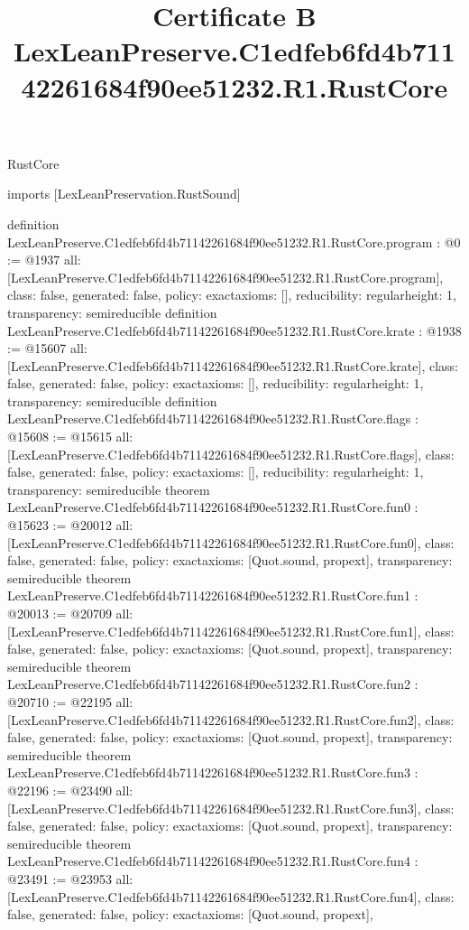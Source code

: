 \begin{lexlean}{RustCore}
\title{Certificate B LexLeanPreserve.C1edfeb6fd4b71142261684f90ee51232.R1.RustCore}
\begin{coremodule}
imports [LexLeanPreservation.RustSound]

definition LexLeanPreserve.C1edfeb6fd4b71142261684f90ee51232.R1.RustCore.program : @0 := @1937 {
  all: [LexLeanPreserve.C1edfeb6fd4b71142261684f90ee51232.R1.RustCore.program],
  class: false,
  generated: false,
  policy: exact{axioms: []},
  reducibility: regular{height: 1},
  transparency: semireducible
}
definition LexLeanPreserve.C1edfeb6fd4b71142261684f90ee51232.R1.RustCore.krate : @1938 := @15607 {
  all: [LexLeanPreserve.C1edfeb6fd4b71142261684f90ee51232.R1.RustCore.krate],
  class: false,
  generated: false,
  policy: exact{axioms: []},
  reducibility: regular{height: 1},
  transparency: semireducible
}
definition LexLeanPreserve.C1edfeb6fd4b71142261684f90ee51232.R1.RustCore.flags : @15608 := @15615 {
  all: [LexLeanPreserve.C1edfeb6fd4b71142261684f90ee51232.R1.RustCore.flags],
  class: false,
  generated: false,
  policy: exact{axioms: []},
  reducibility: regular{height: 1},
  transparency: semireducible
}
theorem LexLeanPreserve.C1edfeb6fd4b71142261684f90ee51232.R1.RustCore.fun0 : @15623 := @20012 {
  all: [LexLeanPreserve.C1edfeb6fd4b71142261684f90ee51232.R1.RustCore.fun0],
  class: false,
  generated: false,
  policy: exact{axioms: [Quot.sound, propext]},
  transparency: semireducible
}
theorem LexLeanPreserve.C1edfeb6fd4b71142261684f90ee51232.R1.RustCore.fun1 : @20013 := @20709 {
  all: [LexLeanPreserve.C1edfeb6fd4b71142261684f90ee51232.R1.RustCore.fun1],
  class: false,
  generated: false,
  policy: exact{axioms: [Quot.sound, propext]},
  transparency: semireducible
}
theorem LexLeanPreserve.C1edfeb6fd4b71142261684f90ee51232.R1.RustCore.fun2 : @20710 := @22195 {
  all: [LexLeanPreserve.C1edfeb6fd4b71142261684f90ee51232.R1.RustCore.fun2],
  class: false,
  generated: false,
  policy: exact{axioms: [Quot.sound, propext]},
  transparency: semireducible
}
theorem LexLeanPreserve.C1edfeb6fd4b71142261684f90ee51232.R1.RustCore.fun3 : @22196 := @23490 {
  all: [LexLeanPreserve.C1edfeb6fd4b71142261684f90ee51232.R1.RustCore.fun3],
  class: false,
  generated: false,
  policy: exact{axioms: [Quot.sound, propext]},
  transparency: semireducible
}
theorem LexLeanPreserve.C1edfeb6fd4b71142261684f90ee51232.R1.RustCore.fun4 : @23491 := @23953 {
  all: [LexLeanPreserve.C1edfeb6fd4b71142261684f90ee51232.R1.RustCore.fun4],
  class: false,
  generated: false,
  policy: exact{axioms: [Quot.sound, propext]},
}
\end{coremodule}
\end{lexlean}
